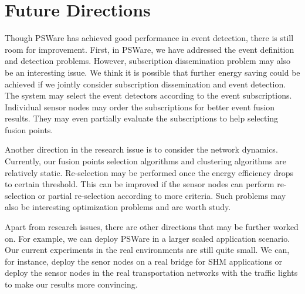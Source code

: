 \section{Future Directions}
Though PSWare has achieved good performance in event detection, there is still room for improvement. First, in PSWare, we have addressed the event definition and detection problems. However, subscription dissemination problem may also be an interesting issue. We think it is possible that further energy saving could be achieved if we jointly consider subscription dissemination and event detection. The system may select the event detectors according to the event subscriptions. Individual sensor nodes may order the subscriptions for better event fusion results. They may even partially evaluate the subscriptions to help selecting fusion points.

Another direction in the research issue is to consider the network dynamics. Currently, our fusion points selection algorithms and clustering algorithms are relatively static. Re-selection may be performed once the energy efficiency drops to certain threshold. This can be improved if the sensor nodes can perform re-selection or partial re-selection according to more criteria. Such problems may also be interesting optimization problems and are worth study.

Apart from research issues, there are other directions that may be further worked on. For example, we can deploy PSWare in a larger scaled application scenario. Our current experiments in the real environments are still quite small. We can, for instance, deploy the senor nodes on a real bridge for SHM applications or deploy the sensor nodes in the real transportation networks with the traffic lights to make our results more convincing.